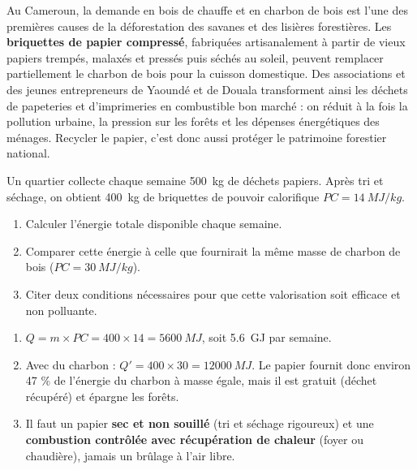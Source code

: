 \documentclass[11pt]{article}
\begin{document}
\begin{savaistu}
Au Cameroun, la demande en bois de chauffe et en charbon de bois est l'une des premières causes de la déforestation des savanes et des lisières forestières. Les \textbf{briquettes de papier compressé}, fabriquées artisanalement à partir de vieux papiers trempés, malaxés et pressés puis séchés au soleil, peuvent remplacer partiellement le charbon de bois pour la cuisson domestique. Des associations et des jeunes entrepreneurs de Yaoundé et de Douala transforment ainsi les déchets de papeteries et d'imprimeries en combustible bon marché : on réduit à la fois la pollution urbaine, la pression sur les forêts et les dépenses énergétiques des ménages. Recycler le papier, c'est donc aussi protéger le patrimoine forestier national.
\end{savaistu}

\begin{exercice}
Un quartier collecte chaque semaine \SI{500}{kg} de déchets papiers. Après tri et séchage, on obtient \SI{400}{kg} de briquettes de pouvoir calorifique $PC = \SI{14}{MJ/kg}$.
\begin{enumerate}
\item Calculer l'énergie totale disponible chaque semaine.
\item Comparer cette énergie à celle que fournirait la même masse de charbon de bois ($PC = \SI{30}{MJ/kg}$).
\item Citer deux conditions nécessaires pour que cette valorisation soit efficace et non polluante.
\end{enumerate}
\end{exercice}

\begin{corrige}
\begin{enumerate}
\item $Q = m \times PC = 400 \times 14 = \SI{5600}{MJ}$, soit \SI{5,6}{GJ} par semaine.
\item Avec du charbon : $Q' = 400 \times 30 = \SI{12000}{MJ}$. Le papier fournit donc environ 47 \% de l'énergie du charbon à masse égale, mais il est gratuit (déchet récupéré) et épargne les forêts.
\item Il faut un papier \textbf{sec et non souillé} (tri et séchage rigoureux) et une \textbf{combustion contrôlée avec récupération de chaleur} (foyer ou chaudière), jamais un brûlage à l'air libre.
\end{enumerate}
\end{corrige}
\end{document}
